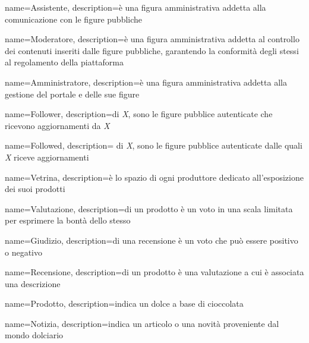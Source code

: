 {
    name={Assistente},
    description={è una figura amministrativa addetta alla comunicazione con le figure pubbliche}
}

{
    name={Moderatore},
    description={è una figura amministrativa addetta al controllo dei contenuti inseriti dalle figure pubbliche, garantendo la conformità degli stessi al regolamento della piattaforma}
}

{
    name={Amministratore},
    description={è una figura amministrativa addetta alla gestione del portale e delle sue figure}
}

{
    name={Follower},
    description={di \emph{X}, sono le figure pubblice autenticate che ricevono aggiornamenti da \emph{X}}
}

{
    name={Followed},
    description={ di \emph{X}, sono le figure pubblice autenticate dalle quali \emph{X} riceve aggiornamenti}
}

{
    name={Vetrina},
    description={è lo spazio di ogni produttore dedicato all'esposizione dei suoi prodotti}
}

{
    name={Valutazione},
    description={di un prodotto è un voto in una scala limitata per esprimere la bontà dello stesso}
}

{
    name={Giudizio},
    description={di una recensione è un voto che può essere positivo o negativo}
}

{
    name={Recensione},
    description={di un prodotto è una valutazione a cui è associata una descrizione}
}

{
    name={Prodotto},
    description={indica un dolce a base di cioccolata}
}

{
    name={Notizia},
    description={indica un articolo o una novità proveniente dal mondo dolciario}
}


